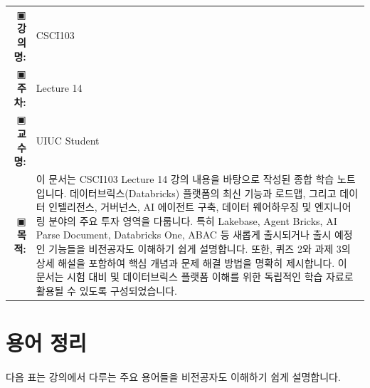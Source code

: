 \documentclass[11pt,a4paper]{article}
\makeatletter
\theoremstyle{definition}
\newcommand{\metainfo}[4]{
\begin{tcolorbox}[
    colback=lightpurple,
    colframe=darkpurple,
    boxrule=1pt,
    arc=2mm,
    left=10pt,
    right=10pt,
    top=8pt,
    bottom=8pt
]
\begin{tabular}{@{}rl@{}}
▣ \textbf{강의명:} & #1 \\[0.3em]
▣ \textbf{주차:} & #2 \\[0.3em]
▣ \textbf{교수명:} & #3 \\[0.3em]
▣ \textbf{목적:} & \begin{minipage}[t]{0.75\textwidth}#4\end{minipage}
\end{tabular}
\end{tcolorbox}
}
\makeatother
\begin{document}
\thispagestyle{firstpage}

\metainfo{CSCI103}{Lecture 14}{UIUC Student}{
이 문서는 CSCI103 Lecture 14 강의 내용을 바탕으로 작성된 종합 학습 노트입니다.
데이터브릭스(Databricks) 플랫폼의 최신 기능과 로드맵, 그리고 데이터 인텔리전스, 거버넌스, AI 에이전트 구축, 데이터 웨어하우징 및 엔지니어링 분야의 주요 투자 영역을 다룹니다.
특히 Lakebase, Agent Bricks, AI Parse Document, Databricks One, ABAC 등 새롭게 출시되거나 출시 예정인 기능들을 비전공자도 이해하기 쉽게 설명합니다.
또한, 퀴즈 2와 과제 3의 상세 해설을 포함하여 핵심 개념과 문제 해결 방법을 명확히 제시합니다.
이 문서는 시험 대비 및 데이터브릭스 플랫폼 이해를 위한 독립적인 학습 자료로 활용될 수 있도록 구성되었습니다.
}

\tableofcontents

\newpage

\section*{용어 정리}

다음 표는 강의에서 다루는 주요 용어들을 비전공자도 이해하기 쉽게 설명합니다.
\end{document}
